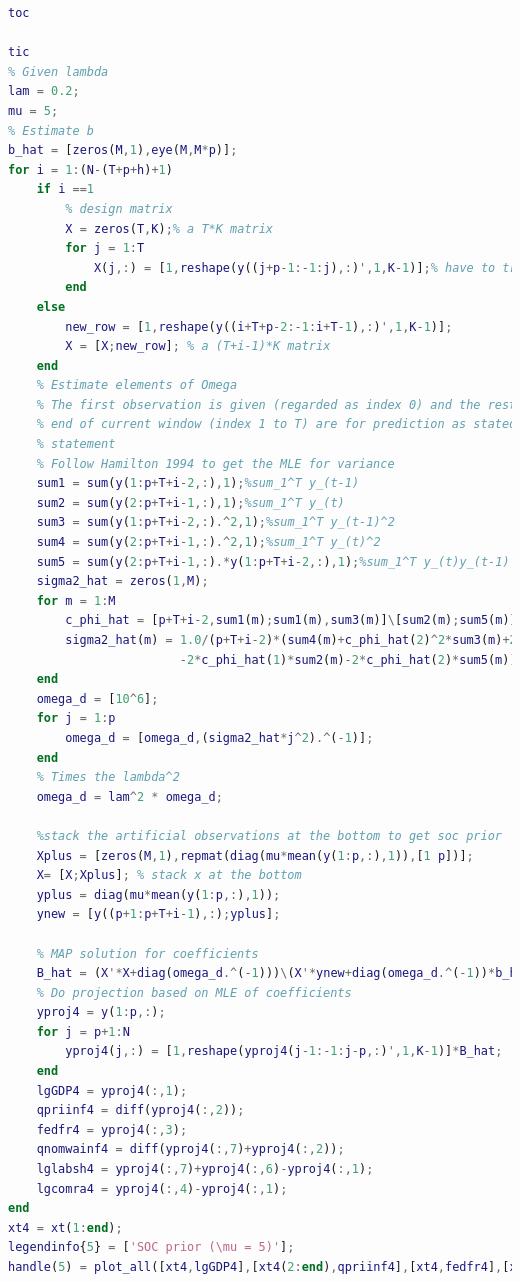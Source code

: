 \documentclass[11pt, oneside]{article}   	%
\begin{document}
\begin{lstlisting}[language=Matlab ,caption={Matlab code for problem 2.}, label={code:prob2}]
toc

tic
% Given lambda
lam = 0.2;
mu = 5;
% Estimate b
b_hat = [zeros(M,1),eye(M,M*p)];
for i = 1:(N-(T+p+h)+1)
    if i ==1
        % design matrix
        X = zeros(T,K);% a T*K matrix
        for j = 1:T
            X(j,:) = [1,reshape(y((j+p-1:-1:j),:)',1,K-1)];% have to transpose because the reshape function operate in column
        end
    else
        new_row = [1,reshape(y((i+T+p-2:-1:i+T-1),:)',1,K-1)];
        X = [X;new_row]; % a (T+i-1)*K matrix
    end
    % Estimate elements of Omega
    % The first observation is given (regarded as index 0) and the rest of observation up to the
    % end of current window (index 1 to T) are for prediction as stated in the problem
    % statement
    % Follow Hamilton 1994 to get the MLE for variance
    sum1 = sum(y(1:p+T+i-2,:),1);%sum_1^T y_(t-1)
    sum2 = sum(y(2:p+T+i-1,:),1);%sum_1^T y_(t)
    sum3 = sum(y(1:p+T+i-2,:).^2,1);%sum_1^T y_(t-1)^2
    sum4 = sum(y(2:p+T+i-1,:).^2,1);%sum_1^T y_(t)^2
    sum5 = sum(y(2:p+T+i-1,:).*y(1:p+T+i-2,:),1);%sum_1^T y_(t)y_(t-1)
    sigma2_hat = zeros(1,M);
    for m = 1:M
        c_phi_hat = [p+T+i-2,sum1(m);sum1(m),sum3(m)]\[sum2(m);sum5(m)];% c_phi_hat = [c_hat,phi_hat]
        sigma2_hat(m) = 1.0/(p+T+i-2)*(sum4(m)+c_phi_hat(2)^2*sum3(m)+2*c_phi_hat(1)*c_phi_hat(2)*sum1(m)...
                        -2*c_phi_hat(1)*sum2(m)-2*c_phi_hat(2)*sum5(m))+c_phi_hat(1)^2;
    end
    omega_d = [10^6];
    for j = 1:p
        omega_d = [omega_d,(sigma2_hat*j^2).^(-1)];
    end
    % Times the lambda^2
    omega_d = lam^2 * omega_d;
    
    %stack the artificial observations at the bottom to get soc prior
    Xplus = [zeros(M,1),repmat(diag(mu*mean(y(1:p,:),1)),[1 p])];    
    X= [X;Xplus]; % stack x at the bottom
    yplus = diag(mu*mean(y(1:p,:),1));
    ynew = [y((p+1:p+T+i-1),:);yplus];
    
    % MAP solution for coefficients
    B_hat = (X'*X+diag(omega_d.^(-1)))\(X'*ynew+diag(omega_d.^(-1))*b_hat');% a K*M matrix
    % Do projection based on MLE of coefficients
    yproj4 = y(1:p,:);
    for j = p+1:N
        yproj4(j,:) = [1,reshape(yproj4(j-1:-1:j-p,:)',1,K-1)]*B_hat; 
    end
    lgGDP4 = yproj4(:,1);
    qpriinf4 = diff(yproj4(:,2));
    fedfr4 = yproj4(:,3);
    qnomwainf4 = diff(yproj4(:,7)+yproj4(:,2));
    lglabsh4 = yproj4(:,7)+yproj4(:,6)-yproj4(:,1);
    lgcomra4 = yproj4(:,4)-yproj4(:,1);
end
xt4 = xt(1:end);
legendinfo{5} = ['SOC prior (\mu = 5)'];
handle(5) = plot_all([xt4,lgGDP4],[xt4(2:end),qpriinf4],[xt4,fedfr4],[xt4(2:end),qnomwainf4],[xt4,lglabsh4],[xt4,lgcomra4],'-.c','SOC prior (\mu = 5)');


\end{lstlisting}
\end{document}
